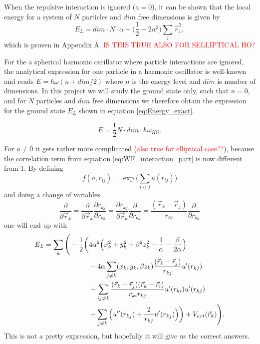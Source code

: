 \documentclass[norsk,a4paper,12pt]{article}
\begin{document}
When the repulsive interaction is ignored ($a=0$), it can be shown that the local energy for a system of $N$ particles and $dim$ free dimensions is given by
\begin{equation}
E_L=dim\cdot N\cdot \alpha + \Big(\frac{1}{2}-2\alpha^2\Big)\sum_i\vec{r}_i^2,
\end{equation}
which is proven in Appendix A. \textcolor{red}{IS THIS TRUE ALSO FOR SELLIPTICAL HO?}

For the a spherical harmonic oscillator where particle interactions are ignored, the analytical expression for one particle in a harmonic oscillator is well-known and reads $E = \hbar\omega(n + dim/2)$ where $n$ is the energy level and $dim$ is number of dimensions. In this project we will study the ground state only, such that $n=0$, and for $N$ particles and $dim$ free dimensions we therefore obtain the expression for the ground state $E_L$ shown in equation \ref{eq:Energy_exact}.

\begin{equation}
E = \frac{1}{2}N\cdot dim\cdot\hbar\omega_{HO}.
\label{eq:Energy_exact}
\end{equation}


For $a\neq0$ it gets rather more complicated  (\textcolor{red}{also true for elliptical case??}), because the correlation term from equation  \ref{eq:WF_interaction_part} is now different from 1. By defining
\begin{equation}
f(a, r_{ij})=\exp{\bigg(\sum_{i<j}u(r_{ij})\bigg)}
\end{equation}
and doing a change of variables
\begin{equation}
\frac{\partial}{\partial \vec{r}_k}=\frac{\partial}{\partial \vec{r}_k}\frac{\partial r_{kj}}{\partial r_{kj}}=\frac{\partial r_{kj}}{\partial \vec{r}_k}\frac{\partial}{\partial r_{kj}}=\frac{(\vec{r}_k-\vec{r}_j)}{r_{kj}}\frac{\partial}{\partial r_{kj}}
\end{equation}
one will end up with
\begin{align}
E_L=\sum_k\Bigg(-\frac{1}{2}\bigg(&4\alpha^2\Big(x_k^2+y_k^2+\beta^2z_k^2-\frac{1}{\alpha}-\frac{\beta}{2\alpha}\Big)\notag\\
&-4\alpha\sum_{j\neq k}(x_k, y_k, \beta z_k)\frac{(\vec{r}_k-\vec{r}_j)}{r_{kj}}u'(r_{kj})\\
&+\sum_{ij\neq k}\frac{(\vec{r}_k-\vec{r}_j)(\vec{r}_k-\vec{r}_i)}{r_{ki}r_{kj}}u'(r_{ki})u'(r_{kj})\notag\\
&+\sum_{j\neq k}\Big(u''(r_{kj})+\frac{2}{r_{kj}}u'(r_{kj})\Big)\bigg)+V_{ext}(\vec{r}_k)\Bigg).\notag
\label{EL_total}
\end{align}
This is not a pretty expression, but hopefully it will give us the correct answers. 
\end{document}
